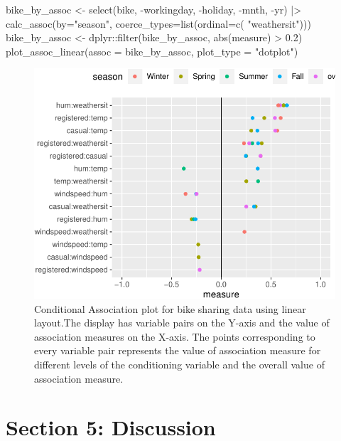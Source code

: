 \begin{Schunk}
\begin{Sinput}
bike_by_assoc <- select(bike, -workingday, -holiday, -mnth, -yr) |>
  calc_assoc(by="season", 
                  coerce_types=list(ordinal=c( "weathersit")))
bike_by_assoc <- dplyr::filter(bike_by_assoc, abs(measure) > 0.2)
plot_assoc_linear(assoc = bike_by_assoc,
                  plot_type = "dotplot")
\end{Sinput}
\begin{figure}

\includegraphics{rj_paper_files/figure-latex/linear-cond-assoc-1} \hfill{}

\caption[Conditional Association plot for bike sharing data using linear layout.The display has variable pairs on the Y-axis and the value of association measures on the X-axis]{Conditional Association plot for bike sharing data using linear layout.The display has variable pairs on the Y-axis and the value of association measures on the X-axis. The points corresponding to every variable pair represents the value of association measure for different levels of the conditioning variable and the overall value of association measure.}\label{fig:linear-cond-assoc}
\end{figure}
\end{Schunk}

\hypertarget{section-5-discussion}{%
\section{Section 5: Discussion}\label{section-5-discussion}}

